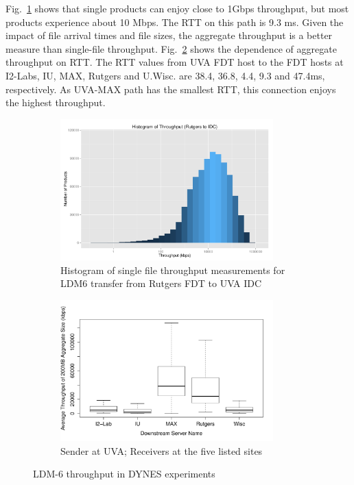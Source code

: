 Fig.~\ref{fig:single-file-throughput} shows that single products can enjoy close to 1Gbps throughput,
but most products experience about 10 Mbps.  The RTT on this path is 9.3 ms.  Given the impact
of file arrival times and file sizes, the aggregate throughput is a better measure than single-file throughput.
Fig.~\ref{fig:DYNES-throughput} shows the dependence of aggregate throughput on RTT. The RTT values from
UVA FDT host to the FDT hosts at I2-Labs, IU, MAX, Rutgers and U.Wisc. are 38.4, 36.8, 4.4, 9.3 and 47.4ms,
respectively. As UVA-MAX path has the smallest RTT, this connection enjoys the highest throughput. 
\begin{figure}
\centering
\begin{subfigure}[b]{0.47\textwidth}
\centering
\includegraphics[width=0.9\textwidth]{figures/1-day-1-rcv-single-product-throughput.pdf}
\caption{Histogram of single file throughput measurements for LDM6 transfer from Rutgers FDT to UVA IDC}
\label{fig:single-file-throughput}
\end{subfigure}
\begin{subfigure}[b]{0.47\textwidth}
\centering
\includegraphics[width=0.9\textwidth]{figures/DYNESThroughput_IP_Path.pdf}
\caption{Sender at UVA; Receivers at the five listed sites}
\label{fig:DYNES-throughput}
\end{subfigure}
\caption{LDM-6 throughput in DYNES experiments}
\label{fig:marking-rate-effects}
\end{figure}

